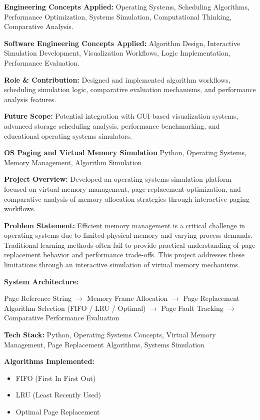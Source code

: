 \documentclass[a4paper,11pt]{article}
\newcommand{\resumeProject}[2]{
\textbf{#1} \hfill {\small #2}
}
\begin{document}
\textbf{Engineering Concepts Applied:}
Operating Systems, Scheduling Algorithms, Performance Optimization, Systems Simulation, Computational Thinking, Comparative Analysis.

\textbf{Software Engineering Concepts Applied:}
Algorithm Design, Interactive Simulation Development, Visualization Workflows, Logic Implementation, Performance Evaluation.

\textbf{Role \& Contribution:}
Designed and implemented algorithm workflows, scheduling simulation logic, comparative evaluation mechanisms, and performance analysis features.

\textbf{Future Scope:}
Potential integration with GUI-based visualization systems, advanced storage scheduling analysis, performance benchmarking, and educational operating systems simulators.




\resumeProject
{OS Paging and Virtual Memory Simulation}
{Python, Operating Systems, Memory Management, Algorithm Simulation}

\textbf{Project Overview:}
Developed an operating systems simulation platform focused on virtual memory management, page replacement optimization, and comparative analysis of memory allocation strategies through interactive paging workflows.

\textbf{Problem Statement:}
Efficient memory management is a critical challenge in operating systems due to limited physical memory and varying process demands. Traditional learning methods often fail to provide practical understanding of page replacement behavior and performance trade-offs. This project addresses these limitations through an interactive simulation of virtual memory mechanisms.

\textbf{System Architecture:}

Page Reference String
$\rightarrow$ Memory Frame Allocation
$\rightarrow$ Page Replacement Algorithm Selection
(FIFO / LRU / Optimal)
$\rightarrow$ Page Fault Tracking
$\rightarrow$ Comparative Performance Evaluation

\textbf{Tech Stack:}
Python, Operating Systems Concepts, Virtual Memory Management, Page Replacement Algorithms, Systems Simulation

\textbf{Algorithms Implemented:}
\begin{itemize}
    \item FIFO (First In First Out)
    \item LRU (Least Recently Used)
    \item Optimal Page Replacement
\end{itemize}
\end{document}
